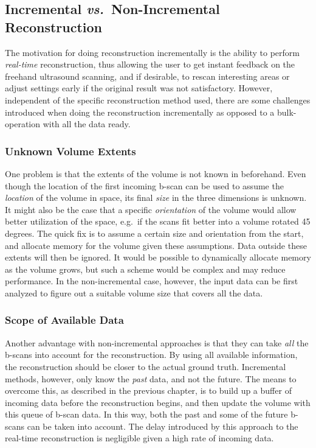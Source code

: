 \subsection{Incremental \textit{vs.}\ Non-Incremental Reconstruction}

	The motivation for doing reconstruction incrementally is the ability to perform \emph{real-time} reconstruction, thus allowing the user to get instant feedback on the freehand ultrasound scanning, and if desirable, to rescan interesting areas or adjust settings early if the original result was not satisfactory. However, independent of the specific reconstruction method used, there are some challenges introduced when doing the reconstruction incrementally as opposed to a bulk-operation with all the data ready.

	\subsubsection{Unknown Volume Extents}
	
	One problem is that the extents of the volume is not known in beforehand. Even though the location of the first incoming b-scan can be used to assume the \emph{location} of the volume in space, its final \emph{size} in the three dimensions is unknown. It might also be the case that a specific \emph{orientation} of the volume would allow better utilization of the space, e.g.\ if the scans fit better into a volume rotated 45 degrees. The quick fix is to assume a certain size and orientation from the start, and allocate memory for the volume given these assumptions. Data outside these extents will then be ignored. It would be possible to dynamically allocate memory as the volume grows, but such a scheme would be complex and may reduce performance. In the non-incremental case, however, the input data can be first analyzed to figure out a suitable volume size that covers all the data.
	
	\subsubsection{Scope of Available Data}
	
	Another advantage with non-incremental approaches is that they can take \emph{all} the b-scans into account for the reconstruction. By using all available information, the reconstruction should be closer to the actual ground truth. Incremental methods, however, only know the \emph{past} data, and not the future. The means to overcome this, as described in the previous chapter, is to build up a buffer of incoming data before the reconstruction begins, and then update the volume with this queue of b-scan data. In this way, both the past and some of the future b-scans can be taken into account. The delay introduced by this approach to the real-time reconstruction is negligible given a high rate of incoming data.
	
